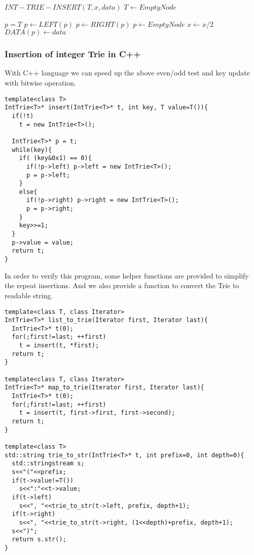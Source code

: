 \documentclass{article}
\begin{document}
\begin{algorithmic}
\STATE $INT-TRIE-INSERT(T, x, data)$
   \STATE $T \leftarrow EmptyNode$ \ENDIF

  \STATE $p=T$
      \STATE $p \leftarrow LEFT(p)$
    \ELSE
      \STATE $p \leftarrow RIGHT(p)$
    \ENDIF
      \STATE $p \leftarrow EmptyNode$ \ENDIF
    \STATE $x \leftarrow x/2$
  \ENDWHILE
  \STATE $DATA(p) \leftarrow data$
\end{algorithmic}

\subsubsection*{Insertion of integer Trie in C++}
With C++ language we can speed up the above even/odd test and key update with
bitwise operation.

\lstset{language=C++}
\begin{lstlisting}
template<class T>
IntTrie<T>* insert(IntTrie<T>* t, int key, T value=T()){
  if(!t)
    t = new IntTrie<T>();

  IntTrie<T>* p = t;
  while(key){
    if( (key&0x1) == 0){
      if(!p->left) p->left = new IntTrie<T>();
      p = p->left;
    }
    else{
      if(!p->right) p->right = new IntTrie<T>();
      p = p->right;
    }
    key>>=1;
  }
  p->value = value;
  return t;
}
\end{lstlisting}

In order to verify this program, some helper functions are provided to
simplify the repeat insertions. And we also provide a function to convert
the Trie to readable string.

\begin{lstlisting}
template<class T, class Iterator>
IntTrie<T>* list_to_trie(Iterator first, Iterator last){
  IntTrie<T>* t(0);
  for(;first!=last; ++first)
    t = insert(t, *first);
  return t;
}

template<class T, class Iterator>
IntTrie<T>* map_to_trie(Iterator first, Iterator last){
  IntTrie<T>* t(0);
  for(;first!=last; ++first)
    t = insert(t, first->first, first->second);
  return t;
}

template<class T>
std::string trie_to_str(IntTrie<T>* t, int prefix=0, int depth=0){
  std::stringstream s;
  s<<"("<<prefix;
  if(t->value!=T())
    s<<":"<<t->value;
  if(t->left)
    s<<", "<<trie_to_str(t->left, prefix, depth+1);
  if(t->right)
    s<<", "<<trie_to_str(t->right, (1<<depth)+prefix, depth+1);
  s<<")";
  return s.str();
}
\end{lstlisting}
\end{document}
